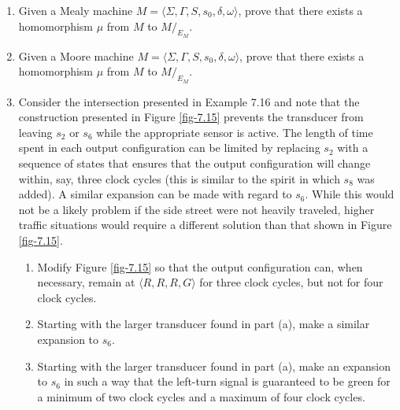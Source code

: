 \begin{enumerate}[{7.}1.]
\item Given a Mealy machine $M=\langle\Sigma,\Gamma,S,s_0,\delta,\omega\rangle$,
prove that there exists a homomorphism $\mu$ from $M$ to $M/  _{E_M}$.

\item Given a Moore machine $M=\langle\Sigma,\Gamma,S,s_0,\delta,\omega\rangle$,
prove that there exists a homomorphism $\mu$ from $M$ to $M/  _{E_M}$.

\item Consider the intersection presented in Example 7.16 and note that the
construction presented in Figure \ref{fig-7.15} prevents the transducer from leaving $s_2$
or $s_6$ while the appropriate sensor is active. The length of time spent in
each output configuration can be limited by replacing $s_2$ with a sequence of
states that ensures that the output configuration will change within, say, three
clock cycles (this is similar to the spirit in which $s_8$ was added). A similar
expansion can be made with regard to $s_6$. While this would not be a likely
problem if the side street were not heavily traveled, higher traffic situations
would require a different solution than that shown in Figure \ref{fig-7.15}.
\begin{enumerate}
\item Modify Figure \ref{fig-7.15} so that the output configuration can, when necessary,
remain at $\langle R,R,R,G\rangle$ for three clock cycles, but not for four
clock cycles.
\item Starting with the larger transducer found in part (a), make a similar
expansion to $s_6$.
\item Starting with the larger transducer found in part (a), make an expansion
to $s_6$ in such a way that the left-turn signal is guaranteed to be green for a
minimum of two clock cycles and a maximum of four clock cycles.
\end{enumerate}


\end{enumerate}
